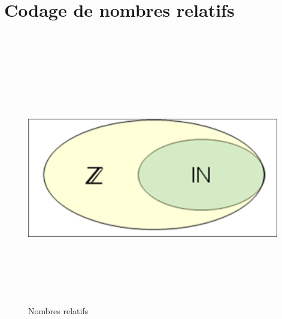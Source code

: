 \documentclass{article}
\begin{document}

\newpage
\section{Codage de nombres relatifs}
\begin{center}
~\newline
\begin{figure}[h]
\begin{center}
	\includegraphics[width=11cm,height=11cm]{illustration2.png}
	\caption[Illustration 2]{Nombres relatifs}
	\label{ill2}
\end{center}
\end{figure}
\end{center}
\end{document}
